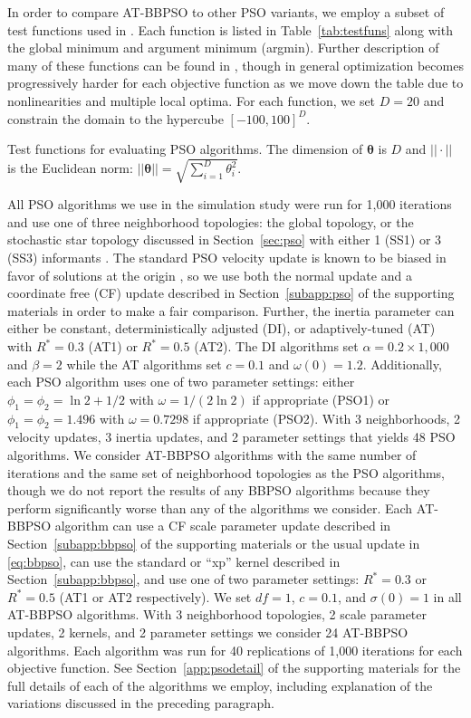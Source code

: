 \documentclass[cmbright]{staauth}
\begin{document}
In order to compare AT-BBPSO to other PSO variants, we employ a subset of test functions used in \cite{hsieh2010modified}. Each function is listed in Table~\ref{tab:testfuns} along with the global minimum and argument minimum (argmin). Further description of many of these functions can be found in \cite{clerc2010particle}, though in general optimization becomes progressively harder for each objective function as we move down the table due to nonlinearities and multiple local optima. For each function, we set $D=20$ and constrain the domain to the hypercube $[-100, 100]^D$.

\begin{table}[p]
\centering

\caption{Test functions for evaluating PSO algorithms. The dimension of $\bm{\theta}$ is $D$ and $||\cdot||$ is the Euclidean norm: $||\bm{\theta}|| = \sqrt{\sum_{i=1}^D\theta_i^2}$.}
\label{tab:testfuns}
\end{table}

All PSO algorithms we use in the simulation study were run for 1,000 iterations and use one of three neighborhood topologies: the global topology, or the stochastic star topology discussed in Section~\ref{sec:pso} with either 1 (SS1) or 3 (SS3) informants \citep{miranda2008stochastic}. The standard PSO velocity update is known to be biased in favor of solutions at the origin \cite[e.g.,][]{monson2005exposing, spears2010biases}, so we use both the normal update and a coordinate free (CF) update described in Section~\ref{subapp:pso} of the supporting materials in order to make a fair comparison. Further, the inertia parameter can either be constant, deterministically adjusted (DI), or adaptively-tuned (AT) with $R^*=0.3$ (AT1) or $R^*=0.5$ (AT2). The DI algorithms set $\alpha=0.2\times 1,000$ and $\beta=2$ while the AT algorithms set $c=0.1$ and $\omega(0)=1.2$. Additionally, each PSO algorithm uses one of two parameter settings: either $\phi_1=\phi_2=\ln2 + 1/2$ with $\omega=1/(2\ln2)$ if appropriate (PSO1) or $\phi_1=\phi_2=1.496$ with $\omega=0.7298$ if appropriate (PSO2). With 3 neighborhoods, 2 velocity updates, 3 inertia updates, and 2 parameter settings that yields 48 PSO algorithms. We consider AT-BBPSO algorithms with the same number of iterations and the same set of neighborhood topologies as the PSO algorithms, though we do not report the results of any BBPSO algorithms because they perform significantly worse than any of the algorithms we consider. Each AT-BBPSO algorithm can use a CF scale parameter update described in Section~\ref{subapp:bbpso} of the supporting materials or the usual update in \eqref{eq:bbpso}, can use the standard or ``xp'' kernel described in Section~\ref{subapp:bbpso}, and use one of two parameter settings: $R^*=0.3$ or $R^*=0.5$ (AT1 or AT2 respectively). We set $df=1$, $c=0.1$, and $\sigma(0)=1$ in all AT-BBPSO algorithms. With 3 neighborhood topologies, 2 scale parameter updates, 2 kernels, and 2 parameter settings we consider 24 AT-BBPSO algorithms. Each algorithm was run for 40 replications of 1,000 iterations for each objective function. See Section~\ref{app:psodetail} of the supporting materials for the full details of each of the algorithms we employ, including explanation of the variations discussed in the preceding paragraph.
\end{document}
